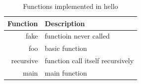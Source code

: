 \documentclass[11pt,letterpaper,oneside]{article}
\begin{document}
\begin{table}[th]
\caption{Functions implemented in hello}
\centering
\begin{tabular}{rl}
\hline
Function & Description \\
\hline
fake & functioin never called \\
foo  & basic function \\
recursive & function call itself recursively \\
main & main function \\
\hline
\end{tabular}
\label{table:mutatee}
\end{table}

\end{document}
